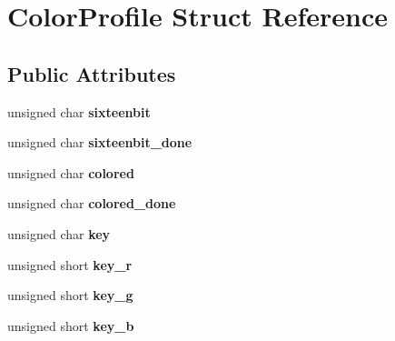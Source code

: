 \hypertarget{struct_color_profile}{\section{Color\-Profile Struct Reference}
\label{struct_color_profile}
}
\subsection*{Public Attributes}
\begin{DoxyCompactItemize}
\item 
\hypertarget{struct_color_profile_a4060733b0b18c705f404e57fe7074492}{unsigned char {\bfseries sixteenbit}}\label{struct_color_profile_a4060733b0b18c705f404e57fe7074492}

\item 
\hypertarget{struct_color_profile_a73c5a699599d34017e7101ae355bafce}{unsigned char {\bfseries sixteenbit\-\_\-done}}\label{struct_color_profile_a73c5a699599d34017e7101ae355bafce}

\item 
\hypertarget{struct_color_profile_a5473d538859f232abe8aaf864ff1548e}{unsigned char {\bfseries colored}}\label{struct_color_profile_a5473d538859f232abe8aaf864ff1548e}

\item 
\hypertarget{struct_color_profile_ab0c56fe33cb50929702a475288ab8e4c}{unsigned char {\bfseries colored\-\_\-done}}\label{struct_color_profile_ab0c56fe33cb50929702a475288ab8e4c}

\item 
\hypertarget{struct_color_profile_ac859f5252253e3e41651d4a40b3f8c07}{unsigned char {\bfseries key}}\label{struct_color_profile_ac859f5252253e3e41651d4a40b3f8c07}

\item 
\hypertarget{struct_color_profile_a6bcd7f7c40c3e8763a3f1185414f4932}{unsigned short {\bfseries key\-\_\-r}}\label{struct_color_profile_a6bcd7f7c40c3e8763a3f1185414f4932}

\item 
\hypertarget{struct_color_profile_a69145711cec524101e185425b4b34899}{unsigned short {\bfseries key\-\_\-g}}\label{struct_color_profile_a69145711cec524101e185425b4b34899}

\item 
\hypertarget{struct_color_profile_a5d9b7502f24a622990f2a532d2f64ac8}{unsigned short {\bfseries key\-\_\-b}}\label{struct_color_profile_a5d9b7502f24a622990f2a532d2f64ac8}


\end{DoxyCompactItemize}
